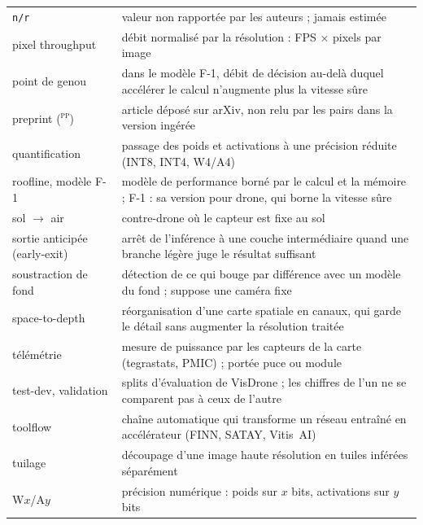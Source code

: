 {\begin{longtable}{@{}>{\raggedright\arraybackslash}p{4.2cm}>{\raggedright\arraybackslash}p{\dimexpr\linewidth-4.2cm-2\tabcolsep\relax}@{}}
\leavevmode\hypertarget{gl:nr}{\texttt{n/r}} & valeur non rapportée par les auteurs ; jamais estimée \\
\leavevmode\hypertarget{gl:pixthr}{pixel throughput} & débit normalisé par la résolution : FPS $\times$ pixels par image \\
\leavevmode\hypertarget{gl:genou}{point de genou} & dans le modèle F-1, débit de décision au-delà duquel accélérer le calcul n'augmente plus la vitesse sûre \\
\leavevmode\hypertarget{gl:preprint}{preprint (\textsuperscript{\textsc{pp}})} & article déposé sur arXiv, non relu par les pairs dans la version ingérée \\
\leavevmode\hypertarget{gl:quantif}{quantification} & passage des poids et activations à une précision réduite (INT8, INT4, W4/A4) \\
\leavevmode\hypertarget{gl:roofline}{roofline, modèle F-1} & modèle de performance borné par le calcul et la mémoire ; F-1 : sa version pour drone, qui borne la vitesse sûre \\
\leavevmode\hypertarget{gl:solair}{sol $\rightarrow$ air} & contre-drone où le capteur est fixe au sol \\
\leavevmode\hypertarget{gl:sortie}{sortie anticipée (early-exit)} & arrêt de l'inférence à une couche intermédiaire quand une branche légère juge le résultat suffisant \\
\leavevmode\hypertarget{gl:soustraction}{soustraction de fond} & détection de ce qui bouge par différence avec un modèle du fond ; suppose une caméra fixe \\
\leavevmode\hypertarget{gl:spacedepth}{space-to-depth} & réorganisation d'une carte spatiale en canaux, qui garde le détail sans augmenter la résolution traitée \\
\leavevmode\hypertarget{gl:telemetrie}{télémétrie} & mesure de puissance par les capteurs de la carte (tegrastats, PMIC) ; portée puce ou module \\
\leavevmode\hypertarget{gl:testdev}{test-dev, validation} & splits d'évaluation de VisDrone ; les chiffres de l'un ne se comparent pas à ceux de l'autre \\
\leavevmode\hypertarget{gl:toolflow}{toolflow} & chaîne automatique qui transforme un réseau entraîné en accélérateur (FINN, SATAY, Vitis~AI) \\
\leavevmode\hypertarget{gl:tuilage}{tuilage} & découpage d'une image haute résolution en tuiles inférées séparément \\
\leavevmode\hypertarget{gl:wa}{W$x$/A$y$} & précision numérique : poids sur $x$ bits, activations sur $y$ bits \\
\bottomrule
\end{longtable}}
